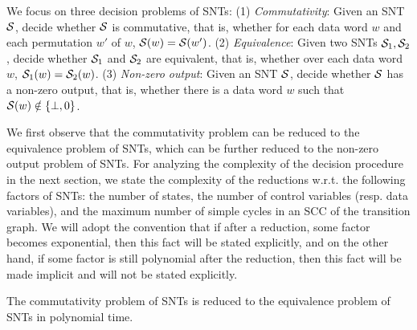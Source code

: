 We focus on three decision problems of SNTs: (1) \emph{Commutativity}: Given an SNT ${\mathcal{S} }$, decide whether ${\mathcal{S} }$ is commutative, that is, whether for each data word $w$ and each permutation $w'$ of $w$, ${\mathcal{S} }(w)={\mathcal{S} }(w')$. (2) \emph{Equivalence}: Given two SNTs ${\mathcal{S} }_1,{\mathcal{S} }_2$, decide whether ${\mathcal{S} }_1$ and ${\mathcal{S} }_2$ are equivalent, that is, whether over each data word $w$, ${\mathcal{S} }_1(w)={\mathcal{S} }_2(w)$. (3) \emph{Non-zero output}: Given an SNT ${\mathcal{S} }$, decide whether ${\mathcal{S} }$ has a non-zero output, that is, whether there is a data word $w$ such that ${\mathcal{S} }(w)\notin \{\bot, 0\}$. 

We first observe that the commutativity problem can be reduced to the equivalence problem of SNTs, which can be further reduced to the non-zero output problem of SNTs. For analyzing the complexity of the decision procedure in the next section,  we state the complexity of the reductions w.r.t. the following factors of SNTs: the number of states, the number of control variables (resp. data variables), and the maximum number of simple cycles in an SCC of the transition graph. We will adopt the convention that if after a reduction, some factor becomes exponential, then this fact will be stated explicitly, and on the other hand, if some factor is still polynomial after the reduction, then this fact will be made implicit and will not be stated explicitly. 

\vspace{-1mm}
\begin{proposition}\label{prop-snt-cmm-to-eqv}
The commutativity problem of SNTs is reduced to the equivalence problem of SNTs in polynomial time.
\end{proposition}


